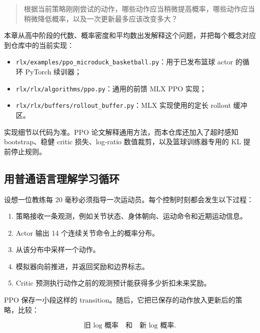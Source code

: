 \documentclass[
  chinese,
  11pt,
  letterpaper,
]{article}
\providecommand{\tightlist}{%
  \setlength{\itemsep}{0pt}\setlength{\parskip}{0pt}}
\begin{document}
\begin{quote}
根据当前策略刚刚尝试的动作，哪些动作应当稍微提高概率，哪些动作应当稍微降低概率，以及一次更新最多应该改变多大？
\end{quote}

本章从高中阶段的代数、概率密度和平均数出发解释这个问题，并把每个概念对应到仓库中的当前实现：

\begin{itemize}
\tightlist
\item
  \texttt{rlx/\allowbreak{}examples\allowbreak{}/\allowbreak{}ppo\_\allowbreak{}microduc\allowbreak{}k\_\allowbreak{}basketba\allowbreak{}ll.py}：用于已发布篮球
  actor 的循环 PyTorch 续训器；
\item
  \texttt{rlx/\allowbreak{}rlx/\allowbreak{}algorith\allowbreak{}ms/\allowbreak{}ppo.py}：通用的前馈
  MLX PPO 实现；
\item
  \texttt{rlx/\allowbreak{}rlx/\allowbreak{}buffers/\allowbreak{}rollout\_\allowbreak{}buffer.p\allowbreak{}y}：MLX
  实现使用的定长 rollout 缓冲区。
\end{itemize}

实现细节以代码为准。PPO 论文解释通用方法，而本仓库还加入了超时感知
bootstrap、稳健 critic 损失、log-ratio 数值裁剪，以及篮球训练器专用的 KL
提前停止规则。

\subsection{用普通语言理解学习循环}\label{ux7528ux666eux901aux8bedux8a00ux7406ux89e3ux5b66ux4e60ux5faaux73af}

设想一位教练每 20 毫秒必须指导一次运动员。每个控制时刻都会发生以下过程：

\begin{enumerate}
\def\labelenumi{\arabic{enumi}.}
\tightlist
\item
  策略接收一条观测，例如关节状态、身体朝向、运动命令和近期运动信息。
\item
  Actor 输出 14 个连续关节命令上的概率分布。
\item
  从该分布中采样一个动作。
\item
  模拟器向前推进，并返回奖励和边界标志。
\item
  Critic 预测执行动作之前的观测预计能获得多少折扣未来奖励。
\end{enumerate}

PPO 保存一小段这样的
transition。随后，它把已保存的动作放入更新后的策略，比较：

\[
\text{旧 log 概率}
\quad\text{和}\quad
\text{新 log 概率}.
\]
\end{document}
